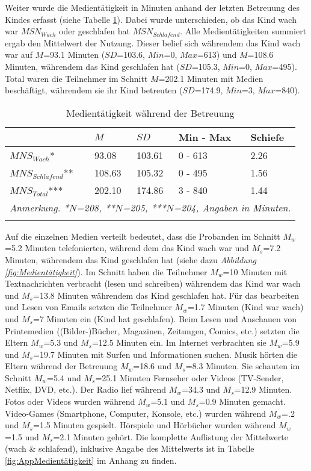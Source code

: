 Weiter wurde die Medientätigkeit in Minuten anhand der letzten Betreuung des Kindes erfasst (siehe Tabelle \ref{table:Medientätigkeit}). Dabei wurde unterschieden, ob das Kind wach war $MSN_{Wach}$ oder geschlafen hat $MSN_{Schlafend}$. Alle Medientätigkeiten summiert ergab den Mittelwert der Nutzung. Dieser belief sich währendem das Kind wach war auf $M$=93.1 Minuten ($SD$=103.6, $Min$=0, $Max$=613) und $M$=108.6 Minuten, währendem das Kind geschlafen hat ($SD$=105.3, $Min$=0, $Max$=495). Total waren die Teilnehmer im Schnitt $M$=202.1 Minuten mit Medien beschäftigt, währendem sie ihr Kind betreuten ($SD$=174.9, $Min$=3, $Max$=840).

\begin{table}[b]
\begin{tabular}{m{8em} m{4em}  m{4em}  m{5em} m{4em}} 
  \hline
  & $M$ & $SD$ & Min - Max & Schiefe\\
  \hline
  $MNS_{Wach}$* & 93.08 & 103.61 & 0 - 613 & 2.26\\
  $MNS_{Schlafend}$** & 108.63 & 105.32 & 0 - 495 & 1.56\\
  $MNS_{Total}$*** & 202.10 & 174.86 & 3 - 840 & 1.44 \\
  \hline
  \multicolumn{5}{l}{\textit{Anmerkung. *$N$=208, **$N$=205, ***$N$=204, Angaben in Minuten.}}\\
  &&&&\\
\end{tabular}
\caption{Medientätigkeit während der Betreuung}
\label{table:Medientätigkeit}
\end{table}

Auf die einzelnen Medien verteilt bedeutet, dass die Probanden im Schnitt $M_{w}$=5.2 Minuten telefonierten, während dem das Kind wach war und $M_{s}$=7.2 Minuten, währendem das Kind geschlafen hat (siehe dazu \textit{Abbildung \ref{fig:Medientätigkeit}}). Im Schnitt haben die Teilnehmer $M_{w}$=10 Minuten mit Textnachrichten verbracht (lesen und schreiben) währendem das Kind war wach und $M_{s}$=13.8 Minuten währendem das Kind geschlafen hat. Für das bearbeiten und Lesen von Emails setzten die Teilnehmer $M_{w}$=1.7 Minuten (Kind war wach) und $M_{s}$=7 Minuten ein (Kind hat geschlafen). Beim Lesen und Anschauen von Printemedien ((Bilder-)Bücher, Magazinen, Zeitungen, Comics, etc.) setzten die Eltern $M_{w}$=5.3 und $M_{s}$=12.5 Minuten ein. Im Internet verbrachten sie $M_{w}$=5.9 und $M_{s}$=19.7 Minuten mit Surfen und Informationen suchen. Musik hörten die Eltern während der Betreuung $M_{w}$=18.6 und $M_{s}$=8.3 Minuten. Sie schauten im Schnitt $M_{w}$=5.4 und $M_{s}$=25.1 Minuten Fernseher oder Videos (TV-Sender, Netflix, DVD, etc.). Der Radio lief während $M_{w}$=34.3 und $M_{s}$=12.9 Minuten. Fotos oder Videos wurden während $M_{w}$=5.1 und $M_{s}$=0.9 Minuten gemacht. Video-Games (Smartphone, Computer, Konsole, etc.) wurden während $M_{w}$=.2 und $M_{s}$=1.5 Minuten gespielt. Hörspiele und Hörbücher wurden während $M_{w}$=1.5 und $M_{s}$=2.1 Minuten gehört. Die komplette Auflistung der Mittelwerte (wach \& schlafend), inklusive Angabe des  Mittelwerts ist in Tabelle \ref{fig:AppMedientätigkeit} im Anhang zu finden.

